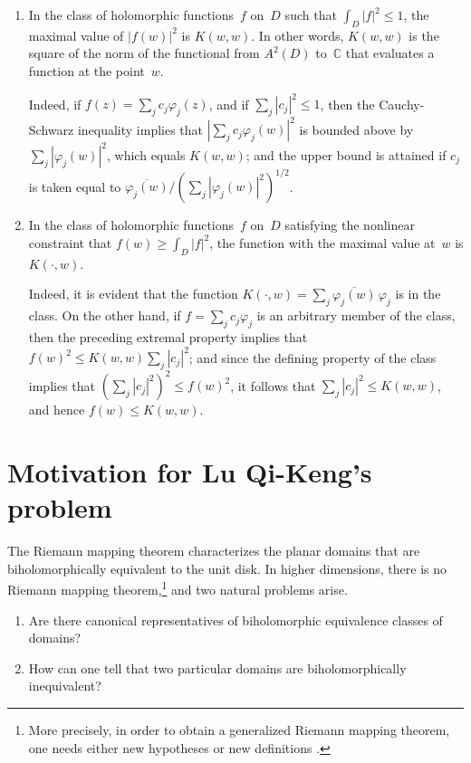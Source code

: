 \documentclass[12pt]{amsart}
\theoremstyle{definition}
\newcommand{\C}{\mathbb{C}}
\begin{document}
\begin{enumerate}
\item In the class of holomorphic functions~\(f\) on~\(D\) such
  that \(\int_D |f|^2\le 1\), the maximal value of \(|f(w)|^2\)
  is \(K(w,w)\). In other words, \(K(w,w)\) is the square of the
  norm of the functional from \(A^2(D)\) to~\(\C\) that
  evaluates a function at the point~\(w\).
  
  Indeed, if \(f(z)=\sum_j c_j \varphi_j(z)\), and if \(\sum_j
  |c_j|^2\le1\), then the Cauchy-Schwarz inequality implies that
  \(|\sum_j c_j \varphi_j(w)|^2\) is bounded above by \(\sum_j
  |\varphi_j(w)|^2\), which equals \(K(w,w)\); and the upper
  bound is attained if \(c_j\) is taken equal to
  \(\overline{\varphi_j(w)}/(\sum_j |\varphi_j(w)|^2)^{1/2}\).
  
\item In the class of holomorphic functions~\(f\) on~\(D\)
  satisfying the nonlinear constraint that \(f(w)\ge \int_D
  |f|^2\), the function with the maximal value at~\(w\) is
  \(K(\cdot,w)\).
  
  Indeed, it is evident that the function \(K(\cdot,w)= \sum_j
  \overline{\varphi_j(w)}\,\varphi_j\) is in the class. On the
  other hand, if \(f=\sum_j c_j \varphi_j\) is an arbitrary
  member of the class, then the preceding extremal property
  implies that \(f(w)^2\le K(w,w)\sum_j |c_j|^2\); and since the
  defining property of the class implies that \((\sum_j
  |c_j|^2)^2 \le f(w)^2\), it follows that \(\sum_j|c_j|^2\le
  K(w,w)\), and hence \(f(w)\le K(w,w)\).
\end{enumerate}

\section{Motivation for Lu Qi-Keng's problem}
The Riemann mapping theorem characterizes the planar domains that
are biholomorphically equivalent to the unit disk. In higher
dimensions, there is no Riemann mapping theorem,\footnote{More
  precisely, in order to obtain a generalized Riemann mapping
  theorem, one needs either new hypotheses \cite{chernji} or new
  definitions \cite{semmes}.} and two natural problems arise.

\begin{enumerate}
\item Are there canonical representatives of biholomorphic
  equivalence classes of domains?
  
\item How can one tell that two particular domains are
biholomorphically inequivalent?
\end{enumerate}
\end{document}
